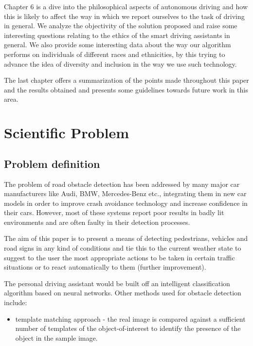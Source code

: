 \documentclass[runningheads,a4paper,11pt]{report}
\begin{document}
Chapter 6 is a dive into the philosophical aspects of autonomous driving and how this is likely to affect the way in which we report ourselves to the task of driving in general. We analyze the objectivity of the solution proposed and raise some interesting questions relating to the ethics of the smart driving assistants in general. We also provide some interesting data about the way our algorithm performs on individuals of different races and ethnicities, by this trying to advance the idea of diversity and inclusion in the way we use such technology.

The last chapter offers a summarization of the points made throughout this paper and the results obtained and presents some guidelines towards future work in this area.

\chapter{Scientific Problem}
\label{section:scientificProblem}


\section{Problem definition}
\label{section:problemDefinition}

The problem of road obstacle detection has been addressed by many major car manufacturers like Audi, BMW, Mercedes-Benz etc., integrating them in new car models in order to improve crash avoidance technology and increase confidence in their cars. However, most of these systems report poor results in badly lit environments and are often faulty in their detection processes.

The aim of this paper is to present a means of detecting pedestrians, vehicles and road signs in any kind of conditions and tie this to the current weather state to suggest to the user the most appropriate actions to be taken in certain traffic situations or to react automatically to them (further improvement).

The personal driving assistant would be built off an intelligent classification algorithm based on neural networks. Other methods used for obstacle detection include:
\begin{itemize}
	\item template matching approach - the real image is compared against a sufficient number of templates of the object-of-interest to identify the presence of the object in the sample image.
\end{itemize}
\end{document}
